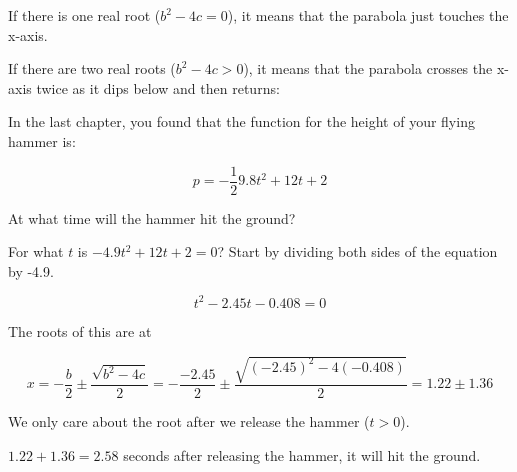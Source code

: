 If there is one real root ($b^2 - 4c = 0$), it means that the parabola just touches the x-axis.


If there are two real roots ($b^2 - 4c > 0$), it means that the parabola crosses the x-axis twice as it dips below and then returns:


\begin{Exercise}[title={Roots of a Quadratic}, label=solve_quadratic]

  In the last chapter, you found that the function for the height of your flying hammer is:

  $$p = -\frac{1}{2}9.8 t^2 + 12t + 2$$

  At what time will the hammer hit the ground?

  
\end{Exercise}
\begin{Answer}[ref=solve_quadratic]

  For what $t$ is  $-4.9 t^2 + 12t + 2 = 0$?  Start by dividing both sides of the equation by -4.9.

  $$t^2 - 2.45 t - 0.408 = 0$$

  The roots of this are at

  $$x = -\frac{b}{2} \pm \frac{\sqrt{b^2 - 4c}}{2} = -\frac{-2.45}{2} \pm \frac{\sqrt{(-2.45)^2 - 4(-0.408)}}{2} = 1.22 \pm 1.36$$

  We only care about the root after we release the hammer ($t > 0$).

  $1.22 + 1.36 = 2.58$ seconds after releasing the hammer, it will hit the ground.

  
\end{Answer}


